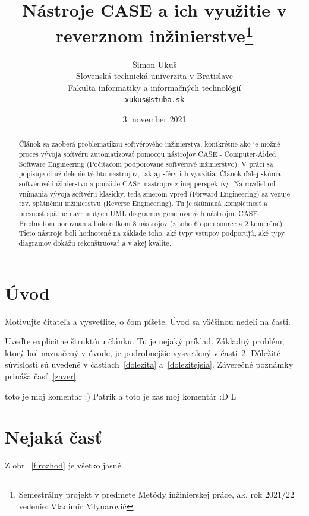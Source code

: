 \documentclass[10pt,twoside,slovak,a4paper]{article}
\title{Nástroje CASE a ich využitie v reverznom inžinierstve\thanks{Semestrálny projekt v predmete Metódy inžinierskej práce, ak. rok 2021/22 vedenie: Vladimír Mlynarovič}} %
\author{Šimon Ukuš\\[2pt]
	{\small Slovenská technická univerzita v Bratislave}\\
	{\small Fakulta informatiky a informačných technológií}\\
	{\small \texttt{xukus@stuba.sk}}
	}
\date{\small 3. november 2021}
\begin{document}
\maketitle

\begin{abstract}
Článok sa zaoberá problematikou softvérového inžinierstva, kontkrétne ako je možné proces vývoja softvéru automatizovať pomocou nástrojov CASE - Computer-Aided Software Engineering (Počítačom podporované softvérové inžinierstvo). V práci sa popisuje či už delenie týchto nástrojov,  tak aj sféry ich využitia.  Článok ďalej skúma softvérové inžinierstvo a použitie CASE nástrojov z inej perspektívy.  Na rozdiel od vnímania vývoja softvéru klasicky, teda smerom vpred (Forward Engineering) sa venuje tzv. spätnému inžinierstvu (Reverse Engineering). Tu je skúmaná kompletnosť a presnosť spätne navrhnutých UML diagramov generovaných nástrojmi CASE. Predmetom porovnania bolo celkom 8 nástrojov (z toho 6 open source a 2 komerčné). Tieto nástroje boli hodnotené na základe toho, aké typy vstupov podporujú, aké typy diagramov dokážu rekonštruovať a v akej kvalite.

\end{abstract}



\section{Úvod}

Motivujte čitateľa a vysvetlite, o čom píšete. Úvod sa väčšinou nedelí na časti.

Uveďte explicitne štruktúru článku. Tu je nejaký príklad.
Základný problém, ktorý bol naznačený v úvode, je podrobnejšie vysvetlený v časti~\ref{nejaka}.
Dôležité súvislosti sú uvedené v častiach~\ref{dolezita} a~\ref{dolezitejsia}.
Záverečné poznámky prináša časť~\ref{zaver}.

toto je moj komentar :) Patrik
a toto je zas moj komentár :D L

\section{Nejaká časť} \label{nejaka}

Z obr.~\ref{f:rozhod} je všetko jasné. 
\end{document}
